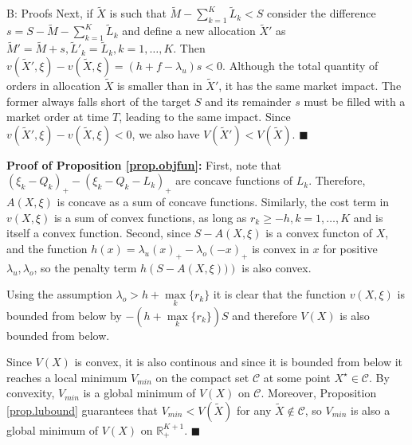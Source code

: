 \documentclass[opre,nonblindrev]{informs3}
\begin{document}
\begin{APPENDIX}{B: Proofs}
Next, if $\tilde X$ is such that $\tilde M-\sum_{k=1}^K{\tilde L_k}<S$ consider the difference $s=S-\tilde M-\sum_{k=1}^K{\tilde L_k}$ and define a new allocation $\tilde X'$ as $\tilde M'=\tilde{M}+s, \tilde L'_k=\tilde{L}_k, k=1,\dots,K$. Then $v(\tilde X',\xi)-v(\tilde X,\xi) = (h + f - \lambda_u)s < 0$. Although the total quantity of orders in allocation $\tilde X$ is smaller than in $\tilde X'$, it has the same market impact. The former always falls short of the target $S$ and its remainder $s$ must be filled with a market order at time $T$, leading to the same impact. Since $v(\tilde X',\xi)-v(\tilde X,\xi) <0$, we also have $V(\tilde X') < V(\tilde X)$.  $\blacksquare$
\newline

\noindent \textbf{Proof of Proposition \ref{prop.objfun}:}
First, note that $(\xi_k-Q_k)_+-(\xi_k-Q_k-L_k)_+$ are concave functions of $L_k$. Therefore, $A(X,\xi)$ is concave as a sum of concave functions. Similarly, the cost term in $v(X,\xi)$ is a sum of convex functions, as long as $r_k\geq -h, k=1,\dots,K$ and is itself a convex function. Second, since $S - A(X,\xi)$ is a convex functon of $X$, and the function $h(x)=\lambda_u(x)_+-\lambda_o(-x)_+$ is convex in $x$ for positive $\lambda_u,\lambda_o$, so the penalty term $h\left(S - A(X,\xi))\right)$ is also convex.

Using the assumption $\lambda_o > h+\underset{k}{\max}\{r_k\}$ it is clear that the function $v(X,\xi)$ is bounded from below by $-(h+\underset{k}{\max}\{r_k\})S$ and therefore $V(X)$ is also bounded from below.

Since $V(X)$ is convex, it is also continous and since it is bounded from below it reaches a local minimum $V_{min}$ on the compact set $\mathcal{C}$ at some point $X^\star\in\mathcal{C}$. By convexity, $V_{min}$ is a global minimum of $V(X)$ on $\mathcal{C}$. Moreover, Proposition \ref{prop.lubound} guarantees that $V_{min}<V(\tilde X)$ for any $\tilde X\notin\mathcal{C}$, so $V_{min}$ is also a global minimum of $V(X)$ on  $\mathbb{R}^{K+1}_+$. $\blacksquare$
\newline





\end{APPENDIX}
\end{document}
